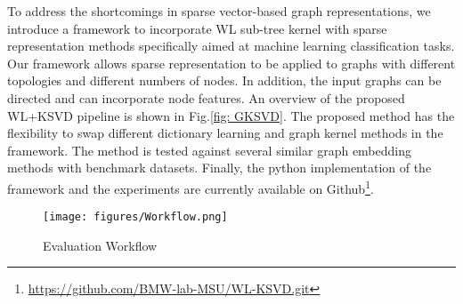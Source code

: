 To address the shortcomings in sparse vector-based graph representations, we introduce a framework to incorporate WL sub-tree kernel with sparse representation methods specifically aimed at machine learning classification tasks. Our framework allows sparse representation to be applied to graphs with different topologies and different numbers of nodes. In addition, the input graphs can be directed and can incorporate node features. An overview of the proposed WL+KSVD pipeline is shown in Fig.\ref{fig: GKSVD}. The proposed method has the flexibility to swap different dictionary learning and graph kernel methods in the framework. The method is tested against several similar graph embedding methods with benchmark datasets. Finally, the python implementation of the framework and the experiments are currently available on Github\footnote{\url{https://github.com/BMW-lab-MSU/WL-KSVD.git}}.

\begin{figure}[!t]
\centerline{\texttt{[image: figures/Workflow.png]}}
\caption{Evaluation Workflow}\label{fig: workflow}
\end{figure}
